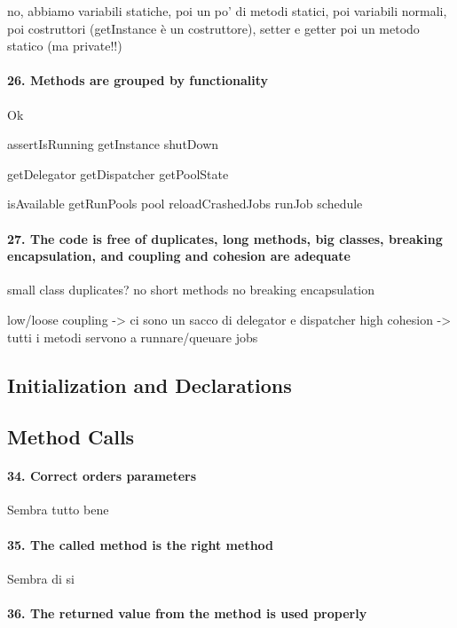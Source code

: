\documentclass[english]{article}
\begin{document}
no, abbiamo variabili statiche, poi un po' di metodi statici, poi variabili normali, poi costruttori (getInstance è un costruttore), setter e getter poi un metodo statico (ma private!!)


\paragraph{26. Methods are grouped by functionality}
Ok

assertIsRunning
getInstance
shutDown

getDelegator
getDispatcher
getPoolState

isAvailable
getRunPools
pool
reloadCrashedJobs
runJob
schedule

\paragraph{27. The code is free of duplicates, long methods, big classes, breaking encapsulation, and coupling and cohesion are adequate}
small class
duplicates? no
short methods
no breaking encapsulation

low/loose coupling -> ci sono un sacco di delegator e dispatcher
high cohesion -> tutti i metodi servono a runnare/queuare jobs

\subsection{Initialization and Declarations}


\subsection{Method Calls}

\paragraph{34. Correct orders parameters}

Sembra tutto bene

\paragraph{35. The called method is the right method}

Sembra di si

\paragraph{36. The returned value from the method is used properly}
\end{document}
